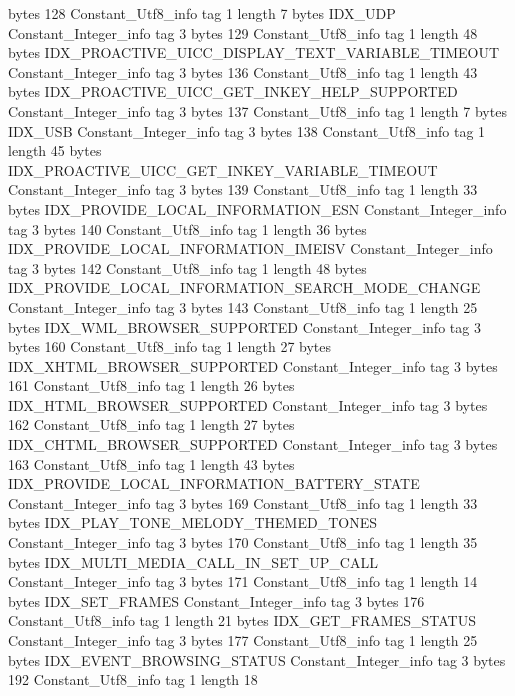 {{{			bytes	128
		}
		Constant_Utf8_info {
			tag	1
			length	7
			bytes	IDX_UDP
		}
		Constant_Integer_info {
			tag	3
			bytes	129
		}
		Constant_Utf8_info {
			tag	1
			length	48
			bytes	IDX_PROACTIVE_UICC_DISPLAY_TEXT_VARIABLE_TIMEOUT
		}
		Constant_Integer_info {
			tag	3
			bytes	136
		}
		Constant_Utf8_info {
			tag	1
			length	43
			bytes	IDX_PROACTIVE_UICC_GET_INKEY_HELP_SUPPORTED
		}
		Constant_Integer_info {
			tag	3
			bytes	137
		}
		Constant_Utf8_info {
			tag	1
			length	7
			bytes	IDX_USB
		}
		Constant_Integer_info {
			tag	3
			bytes	138
		}
		Constant_Utf8_info {
			tag	1
			length	45
			bytes	IDX_PROACTIVE_UICC_GET_INKEY_VARIABLE_TIMEOUT
		}
		Constant_Integer_info {
			tag	3
			bytes	139
		}
		Constant_Utf8_info {
			tag	1
			length	33
			bytes	IDX_PROVIDE_LOCAL_INFORMATION_ESN
		}
		Constant_Integer_info {
			tag	3
			bytes	140
		}
		Constant_Utf8_info {
			tag	1
			length	36
			bytes	IDX_PROVIDE_LOCAL_INFORMATION_IMEISV
		}
		Constant_Integer_info {
			tag	3
			bytes	142
		}
		Constant_Utf8_info {
			tag	1
			length	48
			bytes	IDX_PROVIDE_LOCAL_INFORMATION_SEARCH_MODE_CHANGE
		}
		Constant_Integer_info {
			tag	3
			bytes	143
		}
		Constant_Utf8_info {
			tag	1
			length	25
			bytes	IDX_WML_BROWSER_SUPPORTED
		}
		Constant_Integer_info {
			tag	3
			bytes	160
		}
		Constant_Utf8_info {
			tag	1
			length	27
			bytes	IDX_XHTML_BROWSER_SUPPORTED
		}
		Constant_Integer_info {
			tag	3
			bytes	161
		}
		Constant_Utf8_info {
			tag	1
			length	26
			bytes	IDX_HTML_BROWSER_SUPPORTED
		}
		Constant_Integer_info {
			tag	3
			bytes	162
		}
		Constant_Utf8_info {
			tag	1
			length	27
			bytes	IDX_CHTML_BROWSER_SUPPORTED
		}
		Constant_Integer_info {
			tag	3
			bytes	163
		}
		Constant_Utf8_info {
			tag	1
			length	43
			bytes	IDX_PROVIDE_LOCAL_INFORMATION_BATTERY_STATE
		}
		Constant_Integer_info {
			tag	3
			bytes	169
		}
		Constant_Utf8_info {
			tag	1
			length	33
			bytes	IDX_PLAY_TONE_MELODY_THEMED_TONES
		}
		Constant_Integer_info {
			tag	3
			bytes	170
		}
		Constant_Utf8_info {
			tag	1
			length	35
			bytes	IDX_MULTI_MEDIA_CALL_IN_SET_UP_CALL
		}
		Constant_Integer_info {
			tag	3
			bytes	171
		}
		Constant_Utf8_info {
			tag	1
			length	14
			bytes	IDX_SET_FRAMES
		}
		Constant_Integer_info {
			tag	3
			bytes	176
		}
		Constant_Utf8_info {
			tag	1
			length	21
			bytes	IDX_GET_FRAMES_STATUS
		}
		Constant_Integer_info {
			tag	3
			bytes	177
		}
		Constant_Utf8_info {
			tag	1
			length	25
			bytes	IDX_EVENT_BROWSING_STATUS
		}
		Constant_Integer_info {
			tag	3
			bytes	192
		}
		Constant_Utf8_info {
			tag	1
			length	18
}}}
